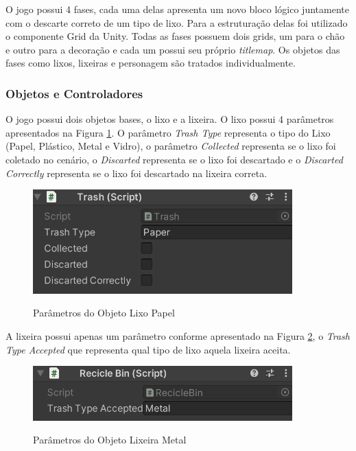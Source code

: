     O jogo possui 4 fases, cada uma delas apresenta um novo bloco lógico juntamente com o descarte correto de um tipo de lixo. Para a estruturação delas foi utilizado o componente Grid da Unity. Todas as fases possuem dois grids, um para o chão e outro para a decoração e cada um possui seu próprio \textit{titlemap}. Os objetos das fases como lixos, lixeiras e personagem são tratados individualmente.
    
    \subsubsection{Objetos e Controladores}
    
    O jogo possui dois objetos bases, o lixo e a lixeira. O lixo possui 4 parâmetros apresentados na Figura \ref{figura:parametros_lixo}. O parâmetro \textit{Trash Type} representa o tipo do Lixo (Papel, Plástico, Metal e Vidro), o parâmetro \textit{Collected} representa se o lixo foi coletado no cenário, o \textit{Discarted} representa se o lixo foi descartado e o \textit{Discarted Correctly} representa se o lixo foi descartado na lixeira correta. 
    
    \begin{figure}[H]
        \caption{Parâmetros do Objeto Lixo Papel}
        \centering
        \includegraphics[width=10cm]{Imagens/Cap4/parametros_lixo.png}
        \label{figura:parametros_lixo}
    \end{figure}
    
    A lixeira possui apenas um parâmetro conforme apresentado na Figura \ref{figura:parametro_lixeira}, o \textit{Trash Type Accepted} que representa qual tipo de lixo aquela lixeira aceita.
    
    \begin{figure}[H]
        \caption{Parâmetros do Objeto Lixeira Metal}
        \centering
        \includegraphics[width=10cm]{Imagens/Cap4/parametro_lixeira.png}
        \label{figura:parametro_lixeira}
    \end{figure}
    
